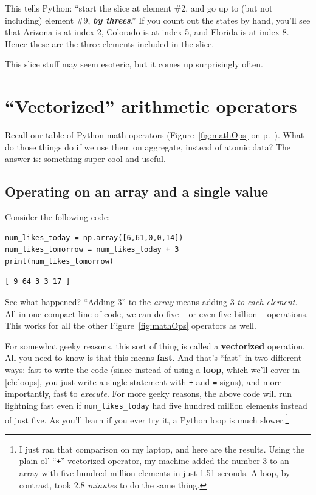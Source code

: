 This tells Python: ``start the slice at element \#2, and go up to (but not
including) element \#9, \textbf{\textit{by threes}}.'' If you count out the
states by hand, you'll see that Arizona is at index 2, Colorado is at index 5,
and Florida is at index 8. Hence these are the three elements included in the
slice.

\smallskip

This slice stuff may seem esoteric, but it comes up surprisingly often.


\section{``Vectorized'' arithmetic operators}

Recall our table of Python math operators (Figure~\ref{fig:mathOps} on
p.~\pageref{fig:mathOps}). What do those things do if we use them on aggregate,
instead of atomic data? The answer is: something super cool and useful.

\subsection{Operating on an array and a single value}

Consider the following code:

\label{vectorizedArrayIntExample}
\begin{Verbatim}[fontsize=\small,samepage=true,frame=single,framesep=3mm]
num_likes_today = np.array([6,61,0,0,14])
num_likes_tomorrow = num_likes_today + 3
print(num_likes_tomorrow)
\end{Verbatim}

\begin{Verbatim}[fontsize=\small,samepage=true,frame=leftline,framesep=5mm,framerule=1mm]
[ 9 64 3 3 17 ]
\end{Verbatim}

See what happened? ``Adding 3'' to the \textit{array} means adding 3 \textit{to
each element}. All in one compact line of code, we can do five -- or even five
billion -- operations. This works for all the other Figure~\ref{fig:mathOps}
operators as well.


For somewhat geeky reasons, this sort of thing is called a \textbf{vectorized}
operation. All you need to know is that this means \textbf{fast}. And that's
``fast'' in two different ways: fast to write the code (since instead of using
a \textbf{loop}, which we'll cover in \ref{ch:loops}, you just write a single
statement with \texttt{+} and \texttt{=} signs), and more importantly, fast to
\textit{execute}. For more geeky reasons, the above code will run lightning
fast even if \texttt{num\_likes\_today} had five hundred million elements
instead of just five. As you'll learn if you ever try it, a Python loop is much
slower.\footnote{I just ran that comparison on my laptop, and here are the
results. Using the plain-ol' ``\texttt{+}'' vectorized operator, my machine
added the number 3 to an array with five hundred million elements in just 1.51
seconds. A loop, by contrast, took 2.8 \textit{minutes} to do the same thing.}

